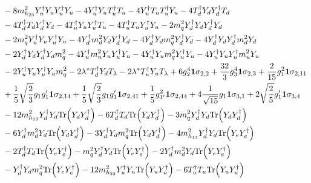 {\begin{align}
 &-8 m_{h_{23}}^2 {Y_{u}^{\dagger}  Y_u  Y_{u}^{\dagger}  Y_u} -4 {Y_{u}^{\dagger}  Y_u  T_{u}^{\dagger}  T_u} -4 {Y_{u}^{\dagger}  T_u  T_{u}^{\dagger}  Y_u} -4 {T_{d}^{\dagger}  Y_d  Y_{d}^{\dagger}  T_d} \nonumber \\ 
 &-4 {T_{d}^{\dagger}  T_d  Y_{d}^{\dagger}  Y_d} -4 {T_{u}^{\dagger}  Y_u  Y_{u}^{\dagger}  T_u} -4 {T_{u}^{\dagger}  T_u  Y_{u}^{\dagger}  Y_u} -2 {m_q^2  Y_{d}^{\dagger}  Y_d  Y_{d}^{\dagger}  Y_d} \nonumber \\ 
 &-2 {m_q^2  Y_{u}^{\dagger}  Y_u  Y_{u}^{\dagger}  Y_u} -4 {Y_{d}^{\dagger}  m_d^2  Y_d  Y_{d}^{\dagger}  Y_d} -4 {Y_{d}^{\dagger}  Y_d  m_q^2  Y_{d}^{\dagger}  Y_d} -4 {Y_{d}^{\dagger}  Y_d  Y_{d}^{\dagger}  m_d^2  Y_d} \nonumber \\ 
 &-2 {Y_{d}^{\dagger}  Y_d  Y_{d}^{\dagger}  Y_d  m_q^2} -4 {Y_{u}^{\dagger}  m_u^2  Y_u  Y_{u}^{\dagger}  Y_u} -4 {Y_{u}^{\dagger}  Y_u  m_q^2  Y_{u}^{\dagger}  Y_u} -4 {Y_{u}^{\dagger}  Y_u  Y_{u}^{\dagger}  m_u^2  Y_u} \nonumber \\ 
 &-2 {Y_{u}^{\dagger}  Y_u  Y_{u}^{\dagger}  Y_u  m_q^2} -2 \lambda^* {T_{d}^{\dagger}  Y_d} T_{\lambda} -2 \lambda^* {T_{u}^{\dagger}  Y_u} T_{\lambda} +6 g_{2}^{4} {\bf 1} \sigma_{2,2} +\frac{32}{3} g_{3}^{4} {\bf 1} \sigma_{2,3} +\frac{2}{15} g_{1}^{2} {\bf 1} \sigma_{2,11} \nonumber \\ 
 &+\frac{1}{5} \sqrt{\frac{2}{3}} g_1 g_1' {\bf 1} \sigma_{2,14} +\frac{1}{5} \sqrt{\frac{2}{3}} g_1 g_1' {\bf 1} \sigma_{2,41} +\frac{1}{5} g_{1'}^{2} {\bf 1} \sigma_{2,44} +4 \frac{1}{\sqrt{15}} g_1 {\bf 1} \sigma_{3,1} +2 \sqrt{\frac{2}{5}} g_1' {\bf 1} \sigma_{3,4} \nonumber \\ 
 &-12 m_{h_{13}}^2 {Y_{d}^{\dagger}  Y_d} \mbox{Tr}\Big({Y_d  Y_{d}^{\dagger}}\Big) -6 {T_{d}^{\dagger}  T_d} \mbox{Tr}\Big({Y_d  Y_{d}^{\dagger}}\Big) -3 {m_q^2  Y_{d}^{\dagger}  Y_d} \mbox{Tr}\Big({Y_d  Y_{d}^{\dagger}}\Big) \nonumber \\ 
 &-6 {Y_{d}^{\dagger}  m_d^2  Y_d} \mbox{Tr}\Big({Y_d  Y_{d}^{\dagger}}\Big) -3 {Y_{d}^{\dagger}  Y_d  m_q^2} \mbox{Tr}\Big({Y_d  Y_{d}^{\dagger}}\Big) -4 m_{h_{13}}^2 {Y_{d}^{\dagger}  Y_d} \mbox{Tr}\Big({Y_e  Y_{e}^{\dagger}}\Big) \nonumber \\ 
 &-2 {T_{d}^{\dagger}  T_d} \mbox{Tr}\Big({Y_e  Y_{e}^{\dagger}}\Big) - {m_q^2  Y_{d}^{\dagger}  Y_d} \mbox{Tr}\Big({Y_e  Y_{e}^{\dagger}}\Big) -2 {Y_{d}^{\dagger}  m_d^2  Y_d} \mbox{Tr}\Big({Y_e  Y_{e}^{\dagger}}\Big) \nonumber \\ 
 &- {Y_{d}^{\dagger}  Y_d  m_q^2} \mbox{Tr}\Big({Y_e  Y_{e}^{\dagger}}\Big) -12 m_{h_{23}}^2 {Y_{u}^{\dagger}  Y_u} \mbox{Tr}\Big({Y_u  Y_{u}^{\dagger}}\Big) -6 {T_{u}^{\dagger}  T_u} \mbox{Tr}\Big({Y_u  Y_{u}^{\dagger}}\Big) \nonumber \\ 

\end{align}}
